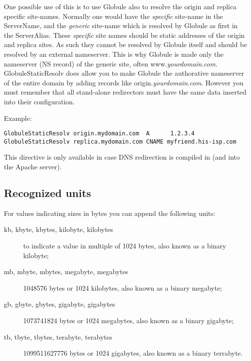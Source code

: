 \documentclass[10pt,a4paper]{article}
\makeatletter
\newenvironment{p}{\@open{P}{}}{\@close{P}}
\newenvironment{p}{}{\par}
\newcommand\subsectionbr{}
\makeatother
\begin{document}
\begin{p}
One possible use of this is to use Globule also to resolve the origin and
replica specific site-names.  Normally one would have the \emph{specific}
site-name in the ServerName, and the \emph{generic} site-name which is
resolved by Globule as first in the ServerAlias.  These \emph{specific} site
names should be static addresses of the origin and replica sites.  As such
they cannot be resolved by Globule itself and should be resolved by an
external nameserver.  This is why Globule is made only the nameserver (NS
record) of the generic site, often www.\textit{yourdomain}.\textit{com}.
GlobuleStaticResolv does allow you to make Globule the authorative nameserver
of the entire domain by adding records like
origin.\textit{yourdomain}.\textit{com}.  However you must remember that all
stand-alone redirectors must have the same data inserted into their
configuration.
\end{p}

\begin{p}
Example:
\end{p}
\begin{Verbatim}
GlobuleStaticResolv origin.mydomain.com  A      1.2.3.4
GlobuleStaticResolv replica.mydomain.com CNAME myfriend.his-isp.com
\end{Verbatim}

This directive is only available in case DNS redirection is compiled in (and
into the Apache server).




\newpage
\subsection{\label{sec:units}Recognized units\subsectionbr}

\begin{p}
For values indicating sizes in bytes you can append the following units:

\begin{description}
\item[kb, kbyte, kbytes, kilobyte, kilobytes]
  to indicate a value in multiple of 1024 bytes, also known as a binary
  kilobyte;
\item[mb, mbyte, mbytes, megabyte, megabytes]
  1048576 bytes or 1024 kilobytes, also known as a binary megabyte;
\item[gb, gbyte, gbytes, gigabyte, gigabytes]
  1073741824 bytes or 1024 megabytes, also known as a binary gigabyte;
\item[tb, tbyte, tbytes, terabyte, terabytes]
  1099511627776 bytes or 1024 gigabytes, also known as a binary terrabyte.
\end{description}
\end{p}
\end{document}
